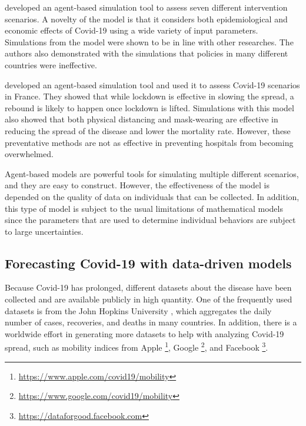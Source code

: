 \citeauthor{silvaCOVIDABSAgentbasedModel2020} \cite{silvaCOVIDABSAgentbasedModel2020} developed an agent-based simulation tool to assess seven different intervention scenarios.
A novelty of the model is that it considers both epidemiological and economic effects of Covid-19 using a wide variety of input parameters.
Simulations from the model were shown to be in line with other researches.
The authors also demonstrated with the simulations that policies in many different countries were ineffective.

\citeauthor{hoertelStochasticAgentbasedModel2020} \cite{hoertelStochasticAgentbasedModel2020} developed an agent-based simulation tool and used it to assess Covid-19 scenarios in France.
They showed that while lockdown is effective in slowing the spread, a rebound is likely to happen once lockdown is lifted.
Simulations with this model also showed that both physical distancing and mask-wearing are effective in reducing the spread of the disease and lower the mortality rate.
However, these preventative methods are not as effective in preventing hospitals from becoming overwhelmed.

Agent-based models are powerful tools for simulating multiple different scenarios, and they are easy to construct.
However, the effectiveness of the model is depended on the quality of data on individuals that can be collected.
In addition, this type of model is subject to the usual limitations of mathematical models since the parameters that are used to determine individual behaviors are subject to large uncertainties.

\subsection{Forecasting Covid-19 with data-driven models}

Because Covid-19 has prolonged, different datasets about the disease have been collected and are available publicly in high quantity.
One of the frequently used datasets is from the John Hopkins University \cite{dongInteractiveWebbasedDashboard2020}, which aggregates the daily number of cases, recoveries, and deaths in many countries.
In addition, there is a worldwide effort in generating more datasets to help with analyzing Covid-19 spread, such as mobility indices from Apple \footnote{\url{https://www.apple.com/covid19/mobility}}, Google \footnote{\url{https://www.google.com/covid19/mobility}}, and Facebook \footnote{\url{https://dataforgood.facebook.com}}.

